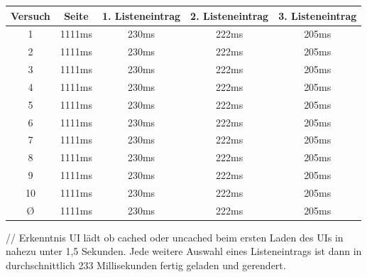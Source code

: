 \vspace{1em}
\begin{center}
  \begin{tabular}{ | c | c | c | c | c | }
    \hline
    \textbf{Versuch}
    & \textbf{Seite} & \textbf{1. Listeneintrag} & \textbf{2. Listeneintrag} & \textbf{3. Listeneintrag}\\
    \hline \hline
    1 & 1111ms & 230ms & 222ms & 205ms\\
    \hline
    2 & 1111ms & 230ms & 222ms & 205ms\\
    \hline
    3 & 1111ms & 230ms & 222ms & 205ms\\
    \hline
    4 & 1111ms & 230ms & 222ms & 205ms\\
    \hline
    5 & 1111ms & 230ms & 222ms & 205ms\\
    \hline
    6 & 1111ms & 230ms & 222ms & 205ms\\
    \hline
    7 & 1111ms & 230ms & 222ms & 205ms\\
    \hline
    8 & 1111ms & 230ms & 222ms & 205ms\\
    \hline
    9 & 1111ms & 230ms & 222ms & 205ms\\
    \hline
    10 & 1111ms & 230ms & 222ms & 205ms\\
    \hline \hline
    \O & 1111ms & 230ms & 222ms & 205ms\\
    \hline
  \end{tabular}
\label{tab:uiloading}
\end{center}

// Erkenntnis UI lädt ob cached oder uncached beim ersten Laden des UIs in nahezu unter 1,5 Sekunden. Jede weitere Auswahl eines Listeneintrags ist dann in durchschnittlich 233 Millisekunden fertig geladen und gerendert.
